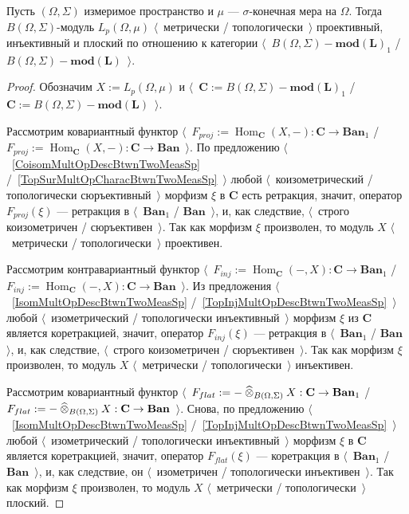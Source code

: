 \begin{proposition}\label{HomTrivlOfLpCat} Пусть $(\Omega,\Sigma)$ измеримое
пространство и $\mu$ --- $\sigma$-конечная мера на $\Omega$. Тогда
$B(\Omega,\Sigma)$-модуль $L_p(\Omega,\mu)$ $\langle$~метрически /
топологически~$\rangle$ проективный, инъективный и плоский по отношению к
категории $\langle$~$B(\Omega,\Sigma)-\mathbf{mod(L)}_1$ /
$B(\Omega,\Sigma)-\mathbf{mod(L)}$~$\rangle$.
\end{proposition}
\begin{proof} Обозначим $X:=L_p(\Omega,\mu)$ и
$\langle$~$\mathbf{C}:=B(\Omega,\Sigma)-\mathbf{mod(L)}_1$ /
$\mathbf{C}:=B(\Omega,\Sigma)-\mathbf{mod(L)}$~$\rangle$. 

Рассмотрим ковариантный функтор
$\langle$~$F_{proj}
    :=\operatorname{Hom}_{\mathbf{C}}(X,-):\mathbf{C}\to\mathbf{Ban}_1$
/
$F_{proj}
    :=\operatorname{Hom}_{\mathbf{C}}(X,-):\mathbf{C}\to\mathbf{Ban}$~$\rangle$.
По предложению $\langle$~\ref{CoisomMultOpDescBtwnTwoMeasSp}
/~\ref{TopSurMultOpCharacBtwnTwoMeasSp}~$\rangle$ любой
$\langle$~коизометрический / топологически сюръективный~$\rangle$ морфизм $\xi$
в $\mathbf{C}$ есть ретракция, значит, оператор $F_{proj}(\xi)$ --- ретракция в
$\langle$~$\mathbf{Ban}_1$ / $\mathbf{Ban}$~$\rangle$, и, как следствие,
$\langle$~строго коизометричен / сюръективен~$\rangle$. Так как морфизм $\xi$
произволен, то модуль $X$ $\langle$~метрически / топологически~$\rangle$
проективен.

Рассмотрим контравариантный функтор
$\langle$~$F_{inj}
    :=\operatorname{Hom}_{\mathbf{C}}(-,X):\mathbf{C}\to\mathbf{Ban}_1$
/
$F_{inj}
    :=\operatorname{Hom}_{\mathbf{C}}(-,X):\mathbf{C}\to\mathbf{Ban}$~$\rangle$.
Из предложения $\langle$~\ref{IsomMultOpDescBtwnTwoMeasSp}
/~\ref{TopInjMultOpDescBtwnTwoMeasSp}~$\rangle$ любой $\langle$~изометрический /
топологически инъективный~$\rangle$ морфизм $\xi$ из $\mathbf{C}$ является
коретракцией, значит, оператор $F_{inj}(\xi)$ --- ретракция в
$\langle$~$\mathbf{Ban}_1$ / $\mathbf{Ban}$~$\rangle$, и, как следствие,
$\langle$~строго коизометричен / сюръективен~$\rangle$. Так как морфизм $\xi$
произволен, то модуль $X$ $\langle$~метрически / топологически~$\rangle$
инъективен.

Рассмотрим ковариантный функтор
$\langle$~$F_{flat}
    :=-\mathbin{\widehat{\otimes}}_{B(\Omega,\Sigma)}X:\mathbf{C}\to\mathbf{Ban}_1$
/
$F_{flat}
    :=-\mathbin{\widehat{\otimes}}_{B(\Omega,\Sigma)}X:\mathbf{C}\to\mathbf{Ban}$~$\rangle$.
Снова, по предложению $\langle$~\ref{IsomMultOpDescBtwnTwoMeasSp}
/~\ref{TopInjMultOpDescBtwnTwoMeasSp}~$\rangle$ любой $\langle$~изометрический /
топологически инъективный~$\rangle$ морфизм $\xi$ в $\mathbf{C}$ является
коретракцией, значит, оператор $F_{flat}(\xi)$ --- коретракция в
$\langle$~$\mathbf{Ban}_1$ / $\mathbf{Ban}$~$\rangle$, и, как следствие, он
$\langle$~изометричен / топологически инъективен~$\rangle$. Так как морфизм
$\xi$ произволен, то модуль $X$ $\langle$~метрически / топологически~$\rangle$
плоский.
\end{proof}  %